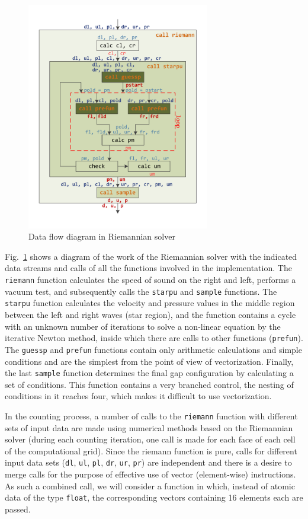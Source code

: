 \documentclass[utf8,english]{psta}%
\begin{document}
\begin{figure}
\includegraphics[width=8cm]{pics/pic_functions}
\caption{Data flow diagram in Riemannian solver}
\label{pic:functions}
\end{figure}

Fig.~\ref{pic:functions} shows a diagram of the work of the Riemannian solver with the indicated data streams and calls of all the functions involved in the implementation. The \texttt{riemann} function calculates the speed of sound on the right and left, performs a vacuum test, and subsequently calls the \texttt{starpu} and \texttt{sample} functions.
The \texttt{starpu} function calculates the velocity and pressure values in the middle region between the left and right waves (star region), and the function contains a cycle with an unknown number of iterations to solve a non-linear equation by the iterative Newton method, inside which there are calls to other functions (\texttt{prefun}).
The \texttt{guessp} and \texttt{prefun} functions contain only arithmetic calculations and simple conditions and are the simplest from the point of view of vectorization.
Finally, the last \texttt{sample} function determines the final gap configuration by calculating a set of conditions.
This function contains a very branched control, the nesting of conditions in it reaches four, which makes it difficult to use vectorization.

In the counting process, a number of calls to the \texttt{riemann} function with different sets of input data are made using numerical methods based on the Riemannian solver (during each counting iteration, one call is made for each face of each cell of the computational grid).
Since the riemann function is pure, calls for different input data sets (\texttt{dl}, \texttt{ul}, \texttt{pl}, \texttt{dr}, \texttt{ur}, \texttt{pr}) are independent and there is a desire to merge calls for the purpose of effective use of vector (element-wise) instructions.
As such a combined call, we will consider a function in which, instead of atomic data of the type \texttt{float}, the corresponding vectors containing 16 elements each are passed.
\end{document}
